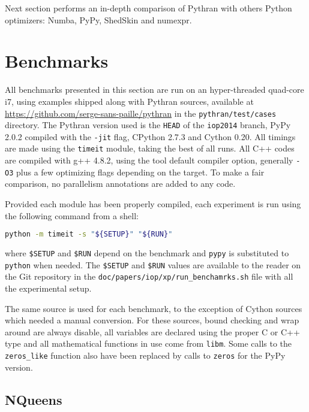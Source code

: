 \documentclass[10pt, onecolumn, preprint]{sigplanconf}
\begin{document}
Next section performs an in-depth comparison of Pythran with others Python
optimizers: Numba, PyPy, ShedSkin and numexpr.


\section{Benchmarks}
\label{sec:benchmarks}


All benchmarks presented in this section are run on an hyper-threaded quad-core
i7, %
using examples shipped along with
Pythran sources, available at \url{https://github.com/serge-sans-paille/pythran} in
the \texttt{pythran/test/cases} directory. The Pythran version used is the
\texttt{HEAD} of the \texttt{iop2014} branch, PyPy 2.0.2 compiled with the
\texttt{-jit} flag, CPython 2.7.3 and Cython 0.20. All timings are made using
the \texttt{timeit} module, taking the best of all runs. All C++ codes are
compiled with g++ 4.8.2, using the tool default compiler option, generally
\texttt{-O3} plus a few optimizing flags depending on the target. To make a
fair comparison, no parallelism annotations are added to any code.

Provided each module has been properly compiled, each experiment is run using
the following command from a shell:

\begin{lstlisting}[language=sh]
python -m timeit -s "${SETUP}" "${RUN}"
\end{lstlisting}

\noindent where \texttt{\$SETUP} and \texttt{\$RUN} depend on the benchmark and
\texttt{pypy} is substituted to \texttt{python} when needed. The
\texttt{\$SETUP} and \texttt{\$RUN} values are available to the reader on the
Git repository in the \texttt{doc/papers/iop/xp/run\_benchamrks.sh} file with
all the experimental setup.

The same source is used for each benchmark, to the exception of Cython sources
which needed a manual conversion. For these sources, bound checking and wrap
around are always disable, all variables are declared using the proper C or C++
type and all mathematical functions in use come from \texttt{libm}. Some calls
to the \texttt{zeros\_like} function also have been replaced by calls to
\texttt{zeros} for the PyPy version.

\subsection{NQueens}
\end{document}
